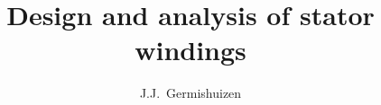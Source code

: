 \documentclass[10pt,a4paper]{book}
\title{Design and analysis of stator windings}
\author{J.J.~Germishuizen}
\begin{document}
\frontmatter

\newtheorem{exercise}{Exercise}[chapter]


\sloppy



\setlength{\headsep}{3ex}
\setlength{\parindent}{0.0in}
\setlength{\parskip}{1.7ex plus 0.5ex minus 0.5ex}
\renewcommand{\baselinestretch}{1.02}

\setlength{\topsep}{-0.0\parskip}
\setlength{\partopsep}{-0.5\parskip}
\setlength{\itemindent}{0.0in}
\setlength{\listparindent}{0.0in}


\makeatletter

\renewcommand{\section}{\@startsection 
    {section} {1} {0mm}%
    {-3.5ex \@plus -1ex \@minus -.2ex}%
    {0.7ex \@plus.2ex}%
    {\normalfont\Large\bfseries}}
\renewcommand\subsection{\@startsection {subsection}{2}{0mm}%
    {-3.25ex\@plus -1ex \@minus -.2ex}%
    {0.3ex \@plus .2ex}%
    {\normalfont\large\bfseries}}
\renewcommand\subsubsection{\@startsection {subsubsection}{3}{0mm}%
    {-3.25ex\@plus -1ex \@minus -.2ex}%
    {0.3ex \@plus .2ex}%
    {\normalfont\normalsize\bfseries}}

\renewcommand{\l@section}{\@dottedtocline{1}{1.5em}{3.0em}}
\setcounter{tocdepth}{1}

\makeatother

\newcommand{\beforefig}{\vspace{1.3\parskip}}
\newcommand{\afterfig}{\vspace{-0.2\parskip}}
\end{document}
